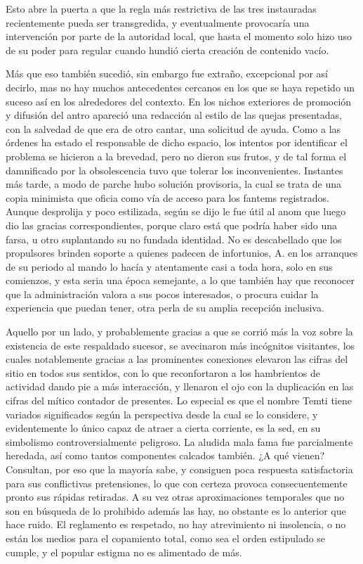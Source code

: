 \documentclass[
]{book}
\begin{document}
Esto abre la puerta a que la regla más restrictiva de las tres instauradas recientemente pueda ser transgredida, y eventualmente provocaría una intervención por parte de la autoridad local, que hasta el momento solo hizo uso de su poder para regular cuando hundió cierta creación de contenido vacío.

Más que eso también sucedió, sin embargo fue extraño, excepcional por así decirlo, mas no hay muchos antecedentes cercanos en los que se haya repetido un suceso así en los alrededores del contexto. En los nichos exteriores de promoción y difusión del antro apareció una redacción al estilo de las quejas presentadas, con la salvedad de que era de otro cantar, una solicitud de ayuda. Como a las órdenes ha estado el responsable de dicho espacio, los intentos por identificar el problema se hicieron a la brevedad, pero no dieron sus frutos, y de tal forma el damnificado por la obsolescencia tuvo que tolerar los inconvenientes. Instantes más tarde, a modo de parche hubo solución provisoria, la cual se trata de una copia minimista que oficia como vía de acceso para los fantems registrados. Aunque desprolija y poco estilizada, según se dijo le fue útil al anom que luego dio las gracias correspondientes, porque claro está que podría haber sido una farsa, u otro suplantando su no fundada identidad. No es descabellado que los propulsores brinden soporte a quienes padecen de infortunios, A. en los arranques de su periodo al mando lo hacía y atentamente casi a toda hora, solo en sus comienzos, y esta seria una época semejante, a lo que también hay que reconocer que la administración valora a sus pocos interesados, o procura cuidar la experiencia que puedan tener, otra perla de su amplia recepción inclusiva.

Aquello por un lado, y probablemente gracias a que se corrió más la voz sobre la existencia de este respaldado sucesor, se avecinaron más incógnitos visitantes, los cuales notablemente gracias a las prominentes conexiones elevaron las cifras del sitio en todos sus sentidos, con lo que reconfortaron a los hambrientos de actividad dando pie a más interacción, y llenaron el ojo con la duplicación en las cifras del mítico contador de presentes. Lo especial es que el nombre Temti tiene variados significados según la perspectiva desde la cual se lo considere, y evidentemente lo único capaz de atraer a cierta corriente, es la sed, en su simbolismo controversialmente peligroso. La aludida mala fama fue parcialmente heredada, así como tantos componentes calcados también. ¿A qué vienen? Consultan, por eso que la mayoría sabe, y consiguen poca respuesta satisfactoria para sus conflictivas pretensiones, lo que con certeza provoca consecuentemente pronto sus rápidas retiradas. A su vez otras aproximaciones temporales que no son en búsqueda de lo prohibido además las hay, no obstante es lo anterior que hace ruido. El reglamento es respetado, no hay atrevimiento ni insolencia, o no están los medios para el copamiento total, como sea el orden estipulado se cumple, y el popular estigma no es alimentado de más.
\end{document}
